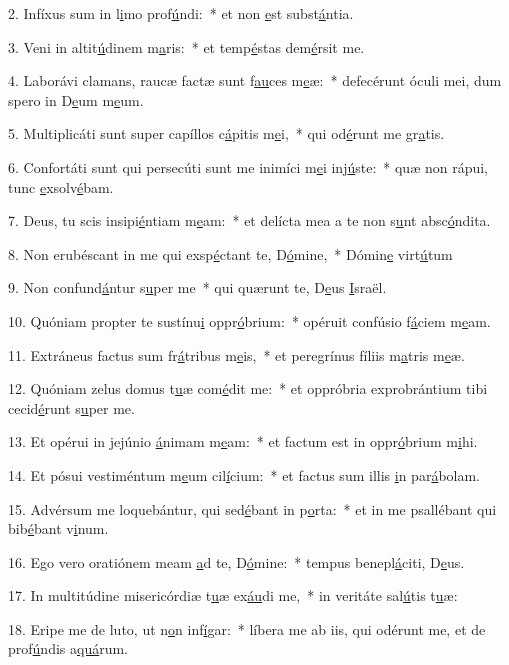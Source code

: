 2. Infíxus sum in l\uline{i}mo prof\uline{ú}ndi:~* et non \uline{e}st subst\uline{á}ntia.\par 
3. Veni in altit\uline{ú}dinem m\uline{a}ris:~* et temp\uline{é}stas dem\uline{é}rsit me.\par 
4. Laborávi clamans, raucæ factæ sunt f\uline{au}ces m\uline{e}æ:~* defecérunt óculi mei, dum spero in D\uline{e}um m\uline{e}um.\par 
5. Multiplicáti sunt super capíllos c\uline{á}pitis m\uline{e}i,~* qui od\uline{é}runt me gr\uline{a}tis.\par 
6. Confortáti sunt qui persecúti sunt me inimíci m\uline{e}i inj\uline{ú}ste:~* quæ non rápui, tunc \uline{e}xsolv\uline{é}bam.\par 
7. Deus, tu scis insipi\uline{é}ntiam m\uline{e}am:~* et delícta mea a te non s\uline{u}nt absc\uline{ó}ndita.\par 
8. Non erubéscant in me qui exsp\uline{é}ctant te, D\uline{ó}mine,~* Dómin\uline{e} virt\uline{ú}tum\par 
9. Non confund\uline{á}ntur s\uline{u}per me~* qui quærunt te, D\uline{e}us \uline{I}sraël.\par 
10. Quóniam propter te sustínu\uline{i} oppr\uline{ó}brium:~* opéruit confúsio f\uline{á}ciem m\uline{e}am.\par 
11. Extráneus factus sum fr\uline{á}tribus m\uline{e}is,~* et peregrínus fíliis m\uline{a}tris m\uline{e}æ.\par 
12. Quóniam zelus domus t\uline{u}æ com\uline{é}dit me:~* et oppróbria exprobrántium tibi cecid\uline{é}runt s\uline{u}per me.\par 
13. Et opérui in jejúnio \uline{á}nimam m\uline{e}am:~* et factum est in oppr\uline{ó}brium m\uline{i}hi.\par 
14. Et pósui vestiméntum m\uline{e}um cil\uline{í}cium:~* et factus sum illis \uline{i}n par\uline{á}bolam.\par 
15. Advérsum me loquebántur, qui sed\uline{é}bant in p\uline{o}rta:~* et in me psallébant qui bib\uline{é}bant v\uline{i}num.\par 
16. Ego vero oratiónem meam \uline{a}d te, D\uline{ó}mine:~* tempus benepl\uline{á}citi, D\uline{e}us.\par 
17. In multitúdine misericórdiæ t\uline{u}æ ex\uline{áu}di me,~* in veritáte sal\uline{ú}tis t\uline{u}æ:\par 
18. Eripe me de luto, ut n\uline{o}n inf\uline{í}gar:~* líbera me ab iis, qui odérunt me, et de prof\uline{ú}ndis a\uline{quá}rum.\par 
